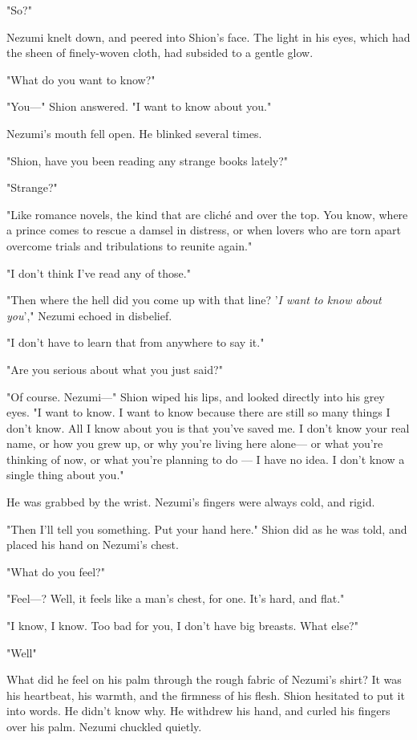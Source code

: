 "So?"

Nezumi knelt down, and peered into Shion's face. The light in his eyes,
which had the sheen of finely-woven cloth, had subsided to a gentle
glow.

"What do you want to know?"

"You---" Shion answered. "I want to know about you."

Nezumi's mouth fell open. He blinked several times.

"Shion, have you been reading any strange books lately?"

"Strange?"

"Like romance novels, the kind that are cliché and over the top. You
know, where a prince comes to rescue a damsel in distress, or when
lovers who are torn apart overcome trials and tribulations to reunite
again."

"I don't think I've read any of those."

"Then where the hell did you come up with that line? '\emph{I want to know
about you}'," Nezumi echoed in disbelief.

"I don't have to learn that from anywhere to say it."

"Are you serious about what you just said?"

"Of course. Nezumi---" Shion wiped his lips, and looked directly into his
grey eyes. "I want to know. I want to know because there are still so
many things I don't know. All I know about you is that you've saved me.
I don't know your real name, or how you grew up, or why you're living
here alone--- or what you're thinking of now, or what you're planning to
do --- I have no idea. I don't know a single thing about you."

He was grabbed by the wrist. Nezumi's fingers were always cold, and
rigid.

"Then I'll tell you something. Put your hand here." Shion did as he was
told, and placed his hand on Nezumi's chest.

"What do you feel?"

"Feel---? Well, it feels like a man's chest, for one. It's hard, and
flat."

"I know, I know. Too bad for you, I don't have big breasts. What else?"

"Well\el "

What did he feel on his palm through the rough fabric of Nezumi's shirt?
It was his heartbeat, his warmth, and the firmness of his flesh. Shion
hesitated to put it into words. He didn't know why. He withdrew his
hand, and curled his fingers over his palm. Nezumi chuckled quietly.

